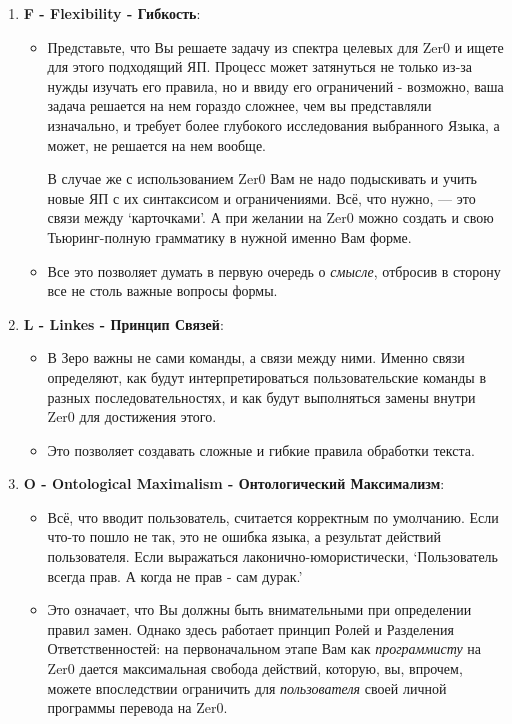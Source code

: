 \documentclass{book}
\begin{document}
\begin{enumerate}

\item \textbf{F - Flexibility - Гибкость}:

\begin{itemize}
\item Представьте, что Вы решаете задачу из спектра целевых для Zer0 и ищете для этого подходящий ЯП. Процесс может затянуться не только из-за нужды изучать его правила, но и ввиду его ограничений - возможно, ваша задача решается на нем гораздо сложнее, чем вы представляли изначально, и требует более глубокого исследования выбранного Языка, а может, не решается на нем вообще.

В случае же с использованием Zer0 Вам не надо подыскивать и учить новые ЯП с их синтаксисом и ограничениями. Всё, что нужно, — это связи между `карточками'. А при желании на Zer0 можно создать и свою Тьюринг-полную грамматику в нужной именно Вам форме.

\item Все это позволяет думать в первую очередь о \textit{смысле}, отбросив в сторону все не столь важные вопросы формы.
\end{itemize}

\item \textbf{L - Linkes - Принцип Связей}:

\begin{itemize}
\item В Зеро важны не сами команды, а связи между ними. Именно связи определяют, как будут интерпретироваться пользовательские команды в разных последовательностях, и как будут выполняться замены внутри Zer0 для достижения этого.
\item Это позволяет создавать сложные и гибкие правила обработки текста. 
\end{itemize}

\item \textbf{O - Ontological Maximalism - Онтологический Максимализм}:

\begin{itemize}
\item Всё, что вводит пользователь, считается корректным по умолчанию. Если что-то пошло не так, это не ошибка языка, а результат действий пользователя. Если выражаться лаконично-юмористически, `Пользователь всегда прав. А когда не прав - сам дурак.'
\item Это означает, что Вы должны быть внимательными при определении правил замен. Однако здесь работает принцип Ролей и Разделения Ответственностей: на первоначальном этапе Вам как \textit{программисту} на Zer0 дается максимальная свобода действий, которую, вы, впрочем, можете впоследствии ограничить для \textit{пользователя} своей личной программы перевода на Zer0.
\end{itemize}


\end{enumerate}
\end{document}
